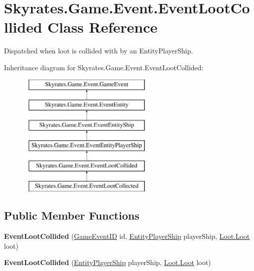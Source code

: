 \hypertarget{class_skyrates_1_1_game_1_1_event_1_1_event_loot_collided}{\section{Skyrates.\-Game.\-Event.\-Event\-Loot\-Collided Class Reference}
\label{class_skyrates_1_1_game_1_1_event_1_1_event_loot_collided}
}


Dispatched when loot is collided with by an Entity\-Player\-Ship.  


Inheritance diagram for Skyrates.\-Game.\-Event.\-Event\-Loot\-Collided\-:\begin{figure}[H]
\begin{center}
\leavevmode
\includegraphics[height=6.000000cm]{class_skyrates_1_1_game_1_1_event_1_1_event_loot_collided}
\end{center}
\end{figure}
\subsection*{Public Member Functions}
\begin{DoxyCompactItemize}
\item 
\hypertarget{class_skyrates_1_1_game_1_1_event_1_1_event_loot_collided_a4b68fde28f0800ae50a4e3acaae28eaa}{{\bfseries Event\-Loot\-Collided} (\hyperlink{namespace_skyrates_1_1_game_1_1_event_ad31565d2f03f234f8f77ebf23ff8f150}{Game\-Event\-I\-D} id, \hyperlink{class_skyrates_1_1_entity_1_1_entity_player_ship}{Entity\-Player\-Ship} player\-Ship, \hyperlink{class_skyrates_1_1_loot_1_1_loot}{Loot.\-Loot} loot)}\label{class_skyrates_1_1_game_1_1_event_1_1_event_loot_collided_a4b68fde28f0800ae50a4e3acaae28eaa}

\item 
\hypertarget{class_skyrates_1_1_game_1_1_event_1_1_event_loot_collided_a3d584e82a8aa764cd11b57cda4181737}{{\bfseries Event\-Loot\-Collided} (\hyperlink{class_skyrates_1_1_entity_1_1_entity_player_ship}{Entity\-Player\-Ship} player\-Ship, \hyperlink{class_skyrates_1_1_loot_1_1_loot}{Loot.\-Loot} loot)}\label{class_skyrates_1_1_game_1_1_event_1_1_event_loot_collided_a3d584e82a8aa764cd11b57cda4181737}

\end{DoxyCompactItemize}
